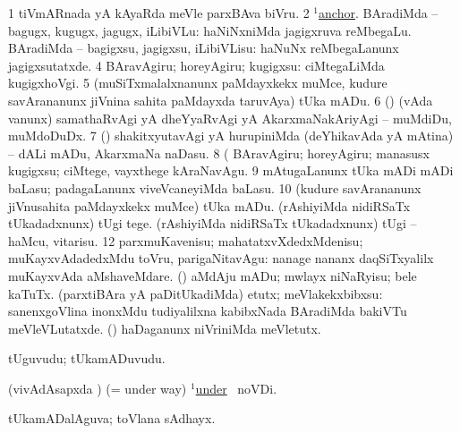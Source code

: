 \noindent 
\gl{\pagu}
\expl{}
\bmng
\bnum
\num{1}  tiVmARnada yA kAyaRda meVle parxBAva biVru. 
\num{2}  \hyperref{kandict_a.pdf}{A}{anchor(1) pagu(7)}{$^1$anchor}. 
  BAradiMda -- bagugx, kugugx, jagugx, iLibiVLu: 
\banum
{}  haNiNxniMda jagigxruva reMbegaLu. 
 BAradiMda -- bagigxsu, jagigxsu, iLibiVLisu:  haNuNx reMbegaLanunx jagigxsutatxde. 
\eanum
\numie
\num{4} BAravAgiru; horeyAgiru; kugigxsu:  ciMtegaLiMda kugigxhoVgi. 
\num{5}  (muSiTxmalalxnanunx paMdayxkekx muMce, kudure savArananunx jiVnina sahita paMdayxda taruvAya) tUka mADu. 
\num{6}  (\AmA) (vAda \mo vanunx) samathaRvAgi yA dheYyaRvAgi yA AkarxmaNakAriyAgi -- muMdiDu, muMdoDuDx. 
\num{7}  (\AmA) shakitxyutavAgi yA hurupiniMda (deYhikavAda yA mAtina) -- dALi mADu, AkarxmaNa naDasu. 
\num{8}  (  BAravAgiru; horeyAgiru; manasusx kugigxsu; ciMtege, vayxthege kAraNavAgu. 
\num{9}  mAtugaLanunx tUka mADi mADi baLasu; padagaLanunx viveVcaneyiMda baLasu. 
\num{10}  (kudure savArananunx jiVnusahita paMdayxkekx muMce) tUka mADu. 
  
\banum
{} (rAshiyiMda nidiRSaTx tUkadadxnunx) tUgi tege. 
 (rAshiyiMda nidiRSaTx tUkadadxnunx) tUgi -- haMcu, vitarisu. 
\eanum
\numie
\num{12}  parxmuKavenisu; mahatatxvXdedxMdenisu; muKayxvAdadedxMdu toVru, parigaNitavAgu:  nanage nananx daqSiTxyalilx muKayxvAda aMshaveMdare. 
  
\banum
{} (\AmA) aMdAju mADu; mwlayx niNaRyisu; bele kaTuTx. 
 (parxtiBAra yA paDitUkadiMda) etutx; meVlakekxbibxsu:  sanenxgoVlina inonxMdu tudiyalilxna kabibxNada BAradiMda bakiVTu meVleVLutatxde.  (\viparx) haDaganunx niVriniMda meVletutx. 
\eanum
\numie
\enum
\emng
\eentry

\bentry
{} 
\gl{\nA}
\expl{}
\bmng
tUguvudu; tUkamADuvudu. 
\emng

\noindent
\gl{\pagu}
\expl{}
\bmng
{} (vivAdAsapxda \parx) (= under way) \hyperref{kandict_u.pdf}{U}{under(1)pagu}{$^1$under} \pagu\ noVDi. 
\emng
\eentry

\bentry
{} 
\gl{\gu}
\expl{}
\bmng
tUkamADalAguva; toVlana sAdhayx. 
\emng
\eentry

